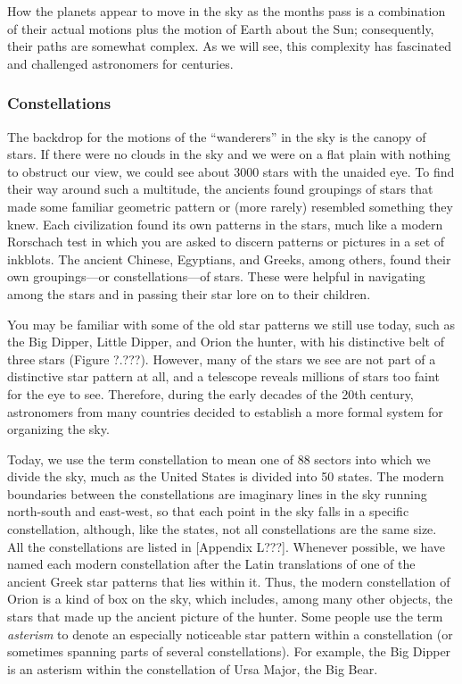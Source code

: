 \documentclass[main.tex]{subfiles}
\begin{document}
\vspace{1em}

How the planets appear to move in the sky as the months pass is a combination of their actual motions plus the motion of Earth about the Sun; consequently, their paths are somewhat complex. As we will see, this complexity has fascinated and challenged astronomers for centuries.

\subsubsection*{Constellations}

The backdrop for the motions of the ``wanderers'' in the sky is the canopy of stars. If there were no clouds in the sky and we were on a flat plain with nothing to obstruct our view, we could see about 3000 stars with the unaided eye. To find their way around such a multitude, the ancients found groupings of stars that made some familiar geometric pattern or (more rarely) resembled something they knew. Each civilization found its own patterns in the stars, much like a modern Rorschach test in which you are asked to discern patterns or pictures in a set of inkblots. The ancient Chinese, Egyptians, and Greeks, among others, found their own groupings---or constellations---of stars. These were helpful in navigating among the stars and in passing their star lore on to their children.

\vspace{1em}

You may be familiar with some of the old star patterns we still use today, such as the Big Dipper, Little Dipper, and Orion the hunter, with his distinctive belt of three stars (Figure ?.???). However, many of the stars we see are not part of a distinctive star pattern at all, and a telescope reveals millions of stars too faint for the eye to see. Therefore, during the early decades of the 20th century, astronomers from many countries decided to establish a more formal system for organizing the sky.


\vspace{1em}

Today, we use the term constellation to mean one of 88 sectors into which we divide the sky, much as the United States is divided into 50 states. The modern boundaries between the constellations are imaginary lines in the sky running north-south and east-west, so that each point in the sky falls in a specific constellation, although, like the states, not all constellations are the same size. All the constellations are listed in [Appendix L???]. Whenever possible, we have named each modern constellation after the Latin translations of one of the ancient Greek star patterns that lies within it. Thus, the modern constellation of Orion is a kind of box on the sky, which includes, among many other objects, the stars that made up the ancient picture of the hunter. Some people use the term \textit{asterism} to denote an especially noticeable star pattern within a constellation (or sometimes spanning parts of several constellations). For example, the Big Dipper is an asterism within the constellation of Ursa Major, the Big Bear.
\end{document}

